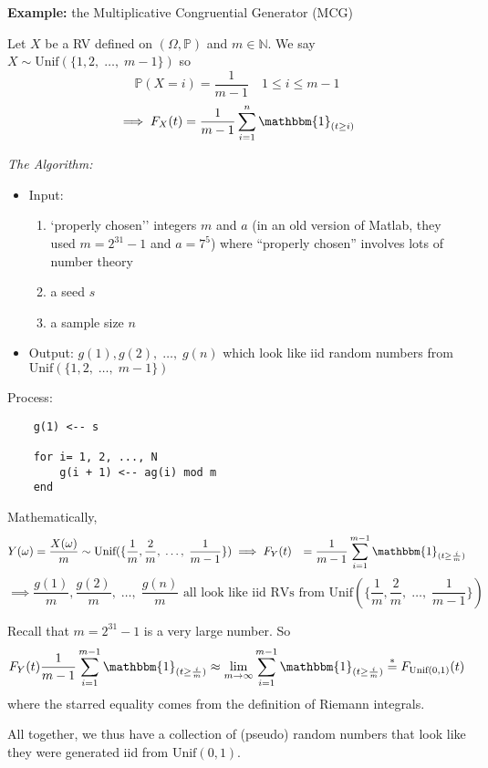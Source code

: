 \documentclass[12pt]{article}
\renewcommand{\P}{\mathbb{P}}
\newcommand{\ind}{\mathbbm{1}}
\newcommand{\ellipsis}{\; \dots, \;}
\begin{document}
\textbf{Example:} the Multiplicative Congruential Generator (MCG)

Let $X$ be a RV defined on $(\Omega, \P)$ and $m \in \mathbb{N}$. We say $X \sim \text{Unif}(\{1, 2, \ellipsis m-1\})$ so 
\[\P(X = i) =  \frac{1}{m - 1} \quad 1 \leq i \leq m-1\]
\[\implies F_X(t) = \frac{1}{m -1}\sum_{i=1}^n \ind_{(t \geq i)}\]

\emph{The Algorithm:}
\begin{itemize}
    \item Input: 
    \begin{enumerate}
        \item `properly chosen'' integers $m$ and $a$ (in an old version of Matlab, they used $m = 2^{31} - 1$ and $a = 7^5$) where ``properly chosen'' involves lots of number theory
        \item a seed $s$
        \item a sample size $n$
    \end{enumerate}

    \item Output: $g(1), g(2), \ellipsis g(n)$ which look like iid random numbers from $\text{Unif}(\{1, 2, \ellipsis m-1\})$
\end{itemize}

Process:
\begin{verbatim}
    g(1) <-- s

    for i= 1, 2, ..., N
        g(i + 1) <-- ag(i) mod m
    end
\end{verbatim}

Mathematically, 
\begin{align*}
    Y(\omega) &=\frac{X(\omega)}{m} \sim \text{Unif}(\{\frac{1}{m}, \frac{2}{m}, \ellipsis \frac{1}{m-1}\}) \implies F_Y(t) &= \frac{1}{m - 1} \sum_{i=1}^{m-1} \ind_{(t \geq \frac{i}{m})}
\end{align*}
\[\implies \frac{g(1)}{m}, \frac{g(2)}{m}, \ellipsis \frac{g(n)}{m} \text{ all look like iid RVs from } \text{Unif}(\{\frac{1}{m}, \frac{2}{m}, \ellipsis \frac{1}{m-1}\})\]

Recall that $m = 2^{31} -1$ is a very large number. So
\[F_Y(t) \frac{1}{m - 1} \sum_{i=1}^{m-1} \ind_{(t \geq \frac{i}{m})} \approx \lim_{m\to \infty} \sum_{i=1}^{m-1} \ind_{(t \geq \frac{i}{m})} \overset{*}{=} F_{\text{Unif}(0, 1)}(t)\]
where the starred equality comes from the definition of Riemann integrals. 

All together, we thus have a collection of (pseudo) random numbers that look like they were generated iid from $\text{Unif}(0, 1)$.
\end{document}
